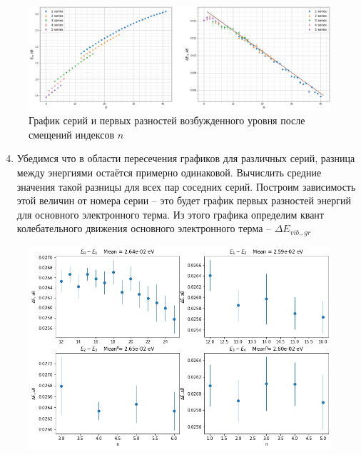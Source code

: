 \documentclass[11.5pt,a4paper,russian]{article}
\begin{document}
\begin{figure}[h!]
  \centering
  \includegraphics[width=\textwidth]{aeedd2af-8426-4789-b56d-b3a72c19f729}  \caption{График серий и первых разностей возбужденного уровня после смещений индексов $n$}
  \label{fig:1_diff}
\end{figure}

\newpage

\begin{enumerate}
  \setcounter{enumi}{3}
  \item Убедимся что в области пересечения графиков для различных серий, разница между энергиями остаётся примерно одинаковой. Вычислить средние значения такой разницы для всех пар соседних серий. Построим зависимость этой величин от номера серии -- это будет график первых разностей энергий для основного электронного терма. Из этого графика определим квант колебательного движения основного электронного терма – $\Delta E_{v i b ., g r}$
\end{enumerate}

\begin{figure}[h!]
  \centering
  \includegraphics[width=\textwidth]{df661de4-e395-41d0-898a-280d23e4e92b}
\end{figure}
\end{document}
